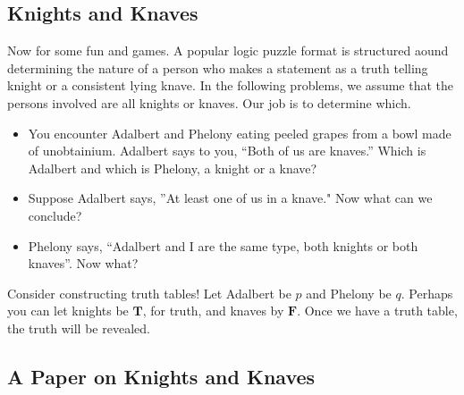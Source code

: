 \subsection{Knights and Knaves}
Now for some fun and games.  A popular logic puzzle format is structured aound determining the nature of a person who makes a statement as a truth telling knight or a consistent lying knave.  In the following problems, we assume that the persons involved are all knights or knaves.  Our job is to determine which.  
\begin{problem}
\begin{itemize}
\item You encounter Adalbert and Phelony eating peeled grapes from a bowl made of unobtainium.  Adalbert says to you, ``Both of us are knaves.'' Which is Adalbert and which is Phelony, a knight or a knave?
\item Suppose Adalbert says, ''At least one of us in a knave."  Now what can we conclude?
\item Phelony says, ``Adalbert and I are the same type, both knights or both knaves''.  Now what?
\end{itemize}
Consider constructing truth tables! Let Adalbert be $p$ and Phelony be $q$.  Perhaps you can let knights be $\mathbf{T}$, for truth, and knaves by $\mathbf{F}$. Once we have a truth table, the truth will be revealed.
\end{problem}

\subsection{A Paper on Knights and Knaves}
\fancyfoot[CE CO]{}
\fancyfoot[RE,RO]{}
\fancyfoot[LE,LO]{}

\begin{center}
\end{center}


